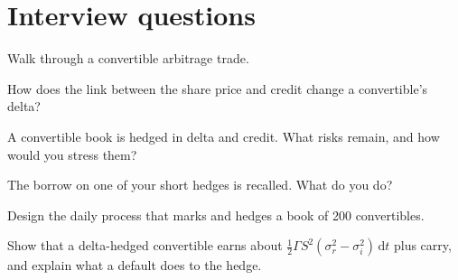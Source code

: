 \section{Interview questions}

\begin{interviewq}\label{iq:s2:convertible-arbitrage:1}
Walk through a convertible arbitrage trade.
\end{interviewq}

\begin{interviewq}\label{iq:s2:convertible-arbitrage:2}
How does the link between the share price and credit change a convertible's delta?
\end{interviewq}

\begin{interviewq}\label{iq:s2:convertible-arbitrage:3}
A convertible book is hedged in delta and credit. What risks remain, and how would you stress them?
\end{interviewq}

\begin{interviewq}\label{iq:s2:convertible-arbitrage:4}
The borrow on one of your short hedges is recalled. What do you do?
\end{interviewq}

\begin{interviewq}\label{iq:s2:convertible-arbitrage:5}
Design the daily process that marks and hedges a book of 200 convertibles.
\end{interviewq}

\begin{interviewq}\label{iq:s2:convertible-arbitrage:6}
Show that a delta-hedged convertible earns about $\tfrac12\Gamma S^2(\sigma_r^2 - \sigma_i^2)\,\mathrm{d}t$ plus carry, and explain what a
default does to the hedge.
\end{interviewq}
